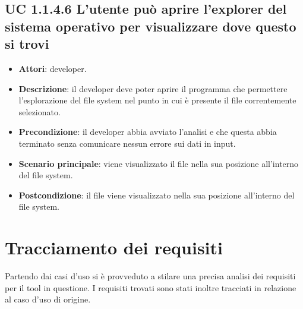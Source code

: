 	\subsection{UC 1.1.4.6 L'utente può aprire l'explorer del sistema operativo per visualizzare dove questo si trovi}
		\label{subsec:UC1.1.4.6}
	
		\begin{itemize}
			\item\textbf{Attori}: developer.
			\item\textbf{Descrizione}: il developer deve poter aprire il programma che permettere l'esplorazione del file system nel punto in cui è presente il file correntemente selezionato.
			\item\textbf{Precondizione}: il developer abbia avviato l'analisi e che questa abbia terminato senza comunicare nessun errore sui dati in input.
			\item\textbf{Scenario principale}: viene visualizzato il file nella sua posizione all'interno del file system.
			\item\textbf{Postcondizione}: il file viene visualizzato nella sua posizione all'interno del file system.
		\end{itemize}


\section{Tracciamento dei requisiti}

	Partendo dai casi d'uso si è provveduto a stilare una precisa analisi dei requisiti per il tool in questione. I requisiti trovati sono stati inoltre tracciati in relazione al caso d'uso di origine.\\

